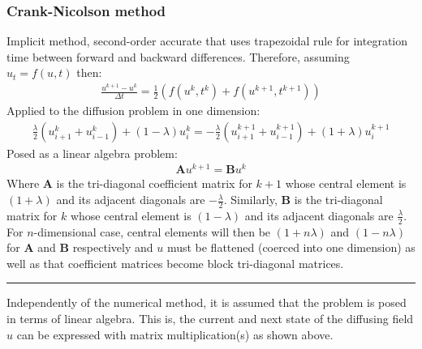 \documentclass[letterpaper,10pt,english]{sphinxmanual}
\begin{document}
\subsubsection{Crank-Nicolson method}
\label{\detokenize{diffusion:crank-nicolson-method}}
Implicit method, second-order accurate that uses trapezoidal rule for
integration time between forward and backward differences. Therefore,
assuming \(u_t=f(u,t)\) then:
\begin{equation*}
\begin{split}\frac{u^{k+1}-u^k}{\Delta t}=\frac{1}{2}\left(f(u^k,t^k)+f(u^{k+1  },t^{k+1})\right)\end{split}
\end{equation*}
Applied to the diffusion problem in one dimension:
\begin{equation*}
\begin{split}\frac{\lambda}{2}\left(u_{i+1}^k+u_{i-1}^k\right)+\left(1-  \lambda\right)u_i^k=-\frac{\lambda}{2}\left(u_{i+1}^{k+1}+  u_{i-1}^{k+1}\right)+\left(1+\lambda\right)u_i^{k+1}\end{split}
\end{equation*}
Posed as a linear algebra problem:
\begin{equation*}
\begin{split}\mathbf{A}u^{k+1}=\mathbf{B}u^k\end{split}
\end{equation*}
Where \(\mathbf{A}\) is the tri-diagonal coefficient matrix for
\(k+1\) whose central element is \((1+\lambda)\) and its
adjacent diagonals are \(-\frac{\lambda}{2}\). Similarly,
\(\mathbf{B}\) is the tri-diagonal matrix for \(k\) whose
central element is \((1-\lambda)\) and its adjacent diagonals are
\(\frac{\lambda}{2}\). For \(n\)-dimensional case, central
elements will then be \((1+n\lambda)\) and \((1-n\lambda)\)
for \(\mathbf{A}\) and \(\mathbf{B}\) respectively and
\(u\) must be flattened (coerced into one dimension) as well as that
coefficient matrices become block tri-diagonal matrices.


\bigskip\hrule\bigskip


Independently of the numerical method, it is assumed that the problem is
posed in terms of linear algebra. This is, the current and next state
of the diffusing field \(u\) can be expressed with matrix
multiplication(s) as shown above.
\end{document}
